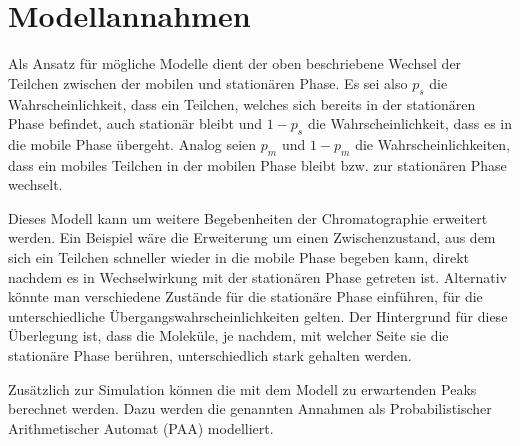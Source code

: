 \documentclass[a4paper,10pt]{article}
\begin{document}




\section{Modellannahmen}
Als Ansatz für mögliche Modelle dient der oben beschriebene Wechsel der Teilchen zwischen der mobilen und stationären Phase. 
Es sei also $p_s$ die Wahrscheinlichkeit, dass ein Teilchen, welches sich bereits in der stationären Phase befindet, auch stationär bleibt und $1-p_s$ die Wahrscheinlichkeit, dass es in die mobile Phase übergeht. Analog seien $p_m$ und $1-p_m$ die Wahrscheinlichkeiten, dass ein mobiles Teilchen in der mobilen Phase bleibt bzw. zur stationären Phase wechselt. 

Dieses Modell kann um weitere Begebenheiten der Chromatographie erweitert werden.
Ein Beispiel wäre die Erweiterung um einen Zwischenzustand, aus dem sich ein Teilchen schneller wieder in die mobile Phase begeben kann, direkt nachdem es in Wechselwirkung mit der stationären Phase getreten ist.
Alternativ könnte man verschiedene Zustände für die stationäre Phase einführen, für die unterschiedliche Übergangswahrscheinlichkeiten gelten. Der Hintergrund für diese Überlegung ist, dass die Moleküle, je nachdem, mit welcher Seite sie die stationäre Phase berühren, unterschiedlich stark gehalten werden. 


Zusätzlich zur Simulation können die mit dem Modell zu erwartenden Peaks berechnet werden. Dazu werden die genannten Annahmen als Probabilistischer Arithmetischer Automat (PAA) \cite{MHKR} modelliert. %
\end{document}
